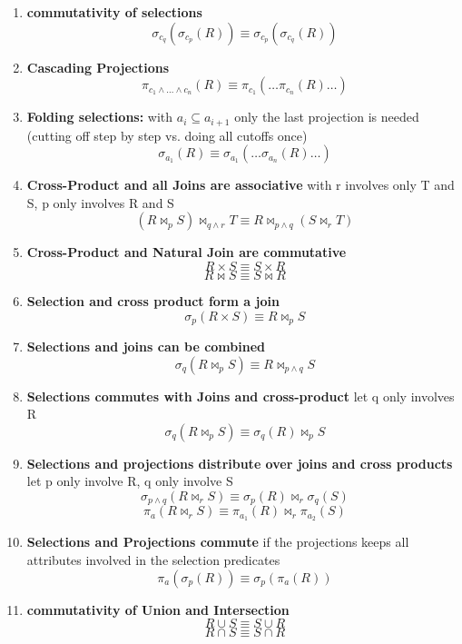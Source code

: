 \documentclass[a4paper]{article}
\begin{document}
\begin{twocolumn}
\begin{enumerate}
	\item \textbf{commutativity of selections}
	\[ \sigma_{c_q }( \sigma_{c_p}(R) ) \equiv \sigma_{c_p}( \sigma_{c_q}(R) ) \]
	
	\item \textbf{Cascading Projections}
	\[ \pi_{c_1 \wedge \dots \wedge c_n}(R) \equiv \pi_{c_1}(\dots \pi_{c_n}(R) \dots) \]
	
	\item \textbf{Folding selections:} with $a_i \subseteq a_{i+1}$ only the last projection is needed (cutting off step by step vs. doing all cutoffs once)
	\[ \sigma_{a_1}(R) \equiv \sigma_{a_1}(\dots \sigma_{a_n}(R) \dots) \]
	
	\item \textbf{Cross-Product and all Joins are associative} with r involves only T and S, p only involves R and S
	\[ (R \bowtie_p S) \bowtie_{q \wedge r} T \equiv R \bowtie_{p \wedge q} (S \bowtie_r T) \]
	
	\item \textbf{Cross-Product and Natural Join are commutative}
	\[ R \times S \equiv S \times R \]
	\[ R \bowtie S \equiv S \bowtie R \]
	
	\item \textbf{Selection and cross product form a join}
	\[ \sigma_p(R \times S) \equiv R \bowtie_p S \] 
	
	\item \textbf{Selections and joins can be combined}
	\[ \sigma_q(R \bowtie_p S) \equiv R \bowtie_{p \wedge q} S \] 
	
	\item \textbf{Selections commutes with Joins and cross-product} let q only involves R
	\[ \sigma_q(R \bowtie_p S) \equiv \sigma_q(R) \bowtie_{p} S \]     
	
	\item \textbf{Selections and projections distribute over joins and cross products} let p only involve R, q only involve S
	\[ \sigma_{p \wedge q}(R \bowtie_r S) \equiv \sigma_p(R) \bowtie_{r} \sigma_q(S) \] 
	\[ \pi_{a}(R \bowtie_r S) \equiv \pi_{a_1}(R) \bowtie_{r} \pi_{a_2}(S) \] 
	
	\item \textbf{Selections and Projections commute } if the projections keeps all attributes involved in the selection predicates
	\[ \pi_a(\sigma_p(R)) \equiv \sigma_p(\pi_a(R)) \] 
	
	\item \textbf{commutativity of Union and Intersection}
	\[ R \cup S \equiv S \cup R  \]
	\[ R \cap S \equiv S \cap R  \]
	

\end{enumerate}
\end{twocolumn}
\end{document}
